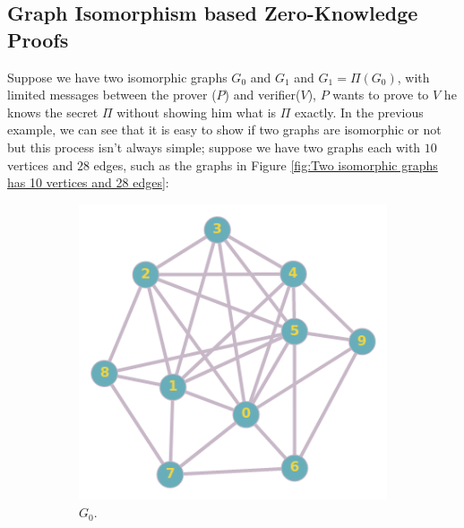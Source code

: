 \documentclass[12pt,a4paper]{article}
\begin{document}
\subsection{Graph Isomorphism based Zero-Knowledge Proofs}
Suppose we have two isomorphic graphs $G_0$ and $G_1$ and $G_1=\Pi(G_0)$, with limited messages between the prover ($P$) and verifier($V$), $P$ wants to prove to $V$ he knows the secret $\Pi$ without showing him what is $\Pi$ exactly.
In the previous example, we can see that it is easy to show if two graphs are isomorphic or not but this process isn’t always simple; suppose we have two graphs each with $10$ vertices and $28$ edges, such as the graphs in Figure \ref{fig:Two isomorphic graphs has 10 vertices and 28 edges}:
\begin{figure}[h!]
	\centering
	\begin{subfigure}[b]{.39\linewidth}
		\includegraphics[width=\linewidth]{ex2_1.png}
		\caption{$G_0$.}
	\end{subfigure}
	\begin{subfigure}[b]{.39\linewidth}

\end{subfigure}
\end{figure}
\end{document}
